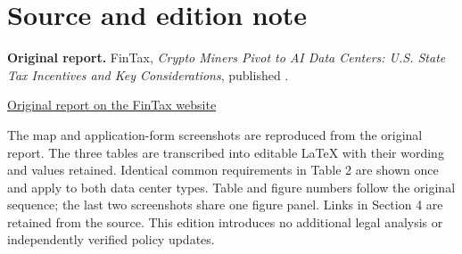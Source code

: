 \section*{Source and edition note}
{}
\noindent\textbf{Original report.} FinTax, \textit{Crypto Miners Pivot to AI Data Centers:
U.S. State Tax Incentives and Key Considerations}, published \ReportDate.\par
\medskip
\noindent\href{\ReportURL}{Original report on the FinTax website}\par
\medskip
\noindent The map and application-form screenshots are reproduced from the original
report. The three tables are transcribed into editable LaTeX with their wording
and values retained. Identical common requirements in Table 2 are shown once
and apply to both data center types. Table and figure numbers follow the original sequence; the last
two screenshots share one figure panel. Links in Section 4 are retained from the
source. This edition introduces no additional legal analysis or independently
verified policy updates.
